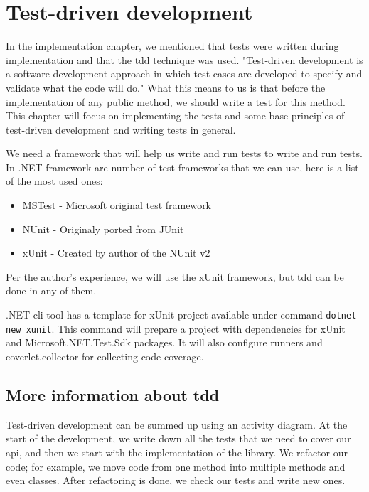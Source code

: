 \chapter {Test-driven development}

In the implementation chapter, we mentioned that tests were written during implementation and that the \acrshort{tdd} technique was used.
"Test-driven development is a software development approach in which test cases are developed to specify and validate what the code will do." \cite{hamilton_what_2020}
What this means to us is that before the implementation of any public method, we should write a test for this method.
This chapter will focus on implementing the tests and some base principles of test-driven development and writing tests in general.

We need a framework that will help us write and run tests to write and run tests.
In .NET framework are number of test frameworks that we can use, here is a list of the most used ones:

\begin{itemize}
    \item {MSTest - Microsoft original test framework}
    \item {NUnit - Originaly ported from JUnit \cite{noauthor_nunitorg_nodate}}
    \item {xUnit - Created by author of the NUnit v2 \cite{noauthor_home_nodate}}
\end{itemize}

Per the author's experience, we will use the xUnit framework, but \acrshort{tdd} can be done in any of them.

.NET \acrshort{cli} tool has a template for xUnit project available under command \texttt{dotnet new xunit}. This command will
prepare a project with dependencies for xUnit and Microsoft.NET.Test.Sdk packages. It will also configure runners and coverlet.collector for collecting
code coverage.

\section{More information about \acrshort{tdd}}

Test-driven development can be summed up using an activity diagram.
At the start of the development, we write down all the tests that we need to cover our \acrshort{api}, and then we start with the implementation of the library.
We refactor our code; for example, we move code from one method into multiple methods and even classes.
After refactoring is done, we check our tests and write new ones.


